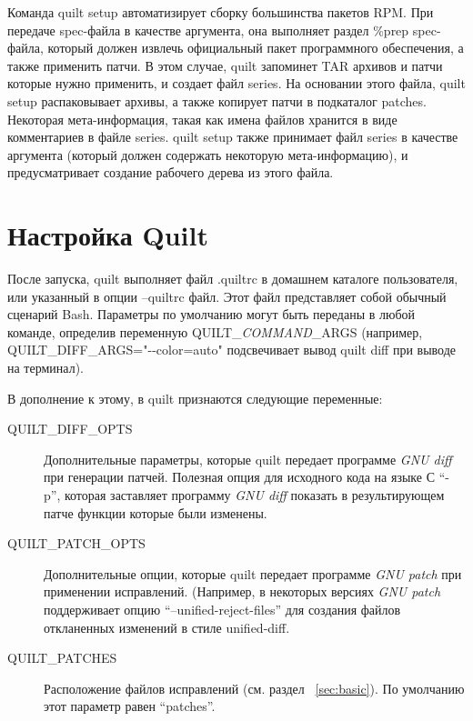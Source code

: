 \documentclass{article}
\newcommand{\quilt}[1]{\textsf{quilt #1}}
\newcommand{\prog}[1]{\textit{#1}}
\begin{document}
Команда \quilt{setup} автоматизирует сборку большинства пакетов RPM. При передаче spec-файла в качестве аргумента, она выполняет раздел \textsf{\%prep} spec-файла, который должен извлечь официальный пакет программного обеспечения, а также применить патчи. В этом случае, quilt запоминет TAR архивов и патчи которые нужно применить, и создает файл \textsf{series}. На основании этого файла, \quilt{setup} распаковывает архивы, а также копирует патчи в подкаталог \textsf{patches}. Некоторая мета-информация, такая как имена файлов хранится в виде комментариев в файле \textsf{series}. \quilt{setup} также принимает файл \textsf{series} в качестве аргумента (который должен содержать некоторую мета-информацию), и предусматривает создание рабочего дерева из этого файла.

\section{Настройка Quilt}

После запуска, quilt выполняет файл \textsf{.quiltrc} в домашнем каталоге пользователя, или указанный в опции \textsf{--quiltrc} файл. Этот файл представляет собой обычный сценарий Bash. Параметры по умолчанию могут быть переданы в любой команде, определив переменную \textsf{QUILT\_\textit{COMMAND}\_ARGS} (например,  \textsf{QUILT\_DIFF\_ARGS="-{}-color=auto"} подсвечивает вывод \quilt{diff} при выводе на терминал).

В дополнение к этому, в quilt признаются следующие переменные:

\begin{description}

\item[\textsf{QUILT\_DIFF\_OPTS}] 
Дополнительные параметры, которые quilt передает программе \prog{GNU diff} при генерации патчей. Полезная опция для исходного кода на языке С ``\textsf{-p}'', которая заставляет программу \prog{GNU diff} показать в результирующем патче функции которые были изменены.

\item[\textsf{QUILT\_PATCH\_OPTS}]
Дополнительные опции, которые quilt передает программе   \prog{GNU patch} при применении исправлений. (Например, в некоторых версиях \prog{GNU patch} поддерживает опцию ``\textsf{--unified-reject-files}'' для создания файлов откланенных изменений в стиле unified-diff.

\item[\textsf{QUILT\_PATCHES}]
Расположение файлов исправлений (см. раздел ~\ref{sec:basic}). По умолчанию этот параметр равен ``\textsf{patches}''.

\end{description}
\end{document}
